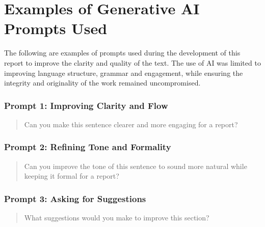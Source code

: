 \chapter{Examples of Generative AI Prompts Used}

The following are examples of prompts used during the development of this report to improve the clarity and quality of the text. The use of AI was limited to improving language structure, grammar and engagement, while ensuring the integrity and originality of the work remained uncompromised.

\subsection*{Prompt 1: Improving Clarity and Flow}
\begin{quote}
Can you make this sentence clearer and more engaging for a report?
\end{quote}

\subsection*{Prompt 2: Refining Tone and Formality}
\begin{quote}
Can you improve the tone of this sentence to sound more natural while keeping it formal for a report?
\end{quote}

\subsection*{Prompt 3: Asking for Suggestions}
\begin{quote}
What suggestions would you make to improve this section?
\end{quote}
